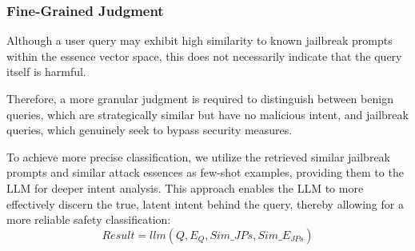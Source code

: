 \subsubsection{Fine-Grained Judgment}
Although a user query may exhibit high similarity to known jailbreak prompts within the essence vector space, this does not necessarily indicate that the query itself is harmful.

Therefore, a more granular judgment is required to distinguish between benign queries, which are strategically similar but have no malicious intent, and jailbreak queries, which genuinely seek to bypass security measures.

To achieve more precise classification, we utilize the retrieved similar jailbreak prompts and similar attack essences as few-shot examples, providing them to the LLM for deeper intent analysis. This approach enables the LLM to more effectively discern the true, latent intent behind the query, thereby allowing for a more reliable safety classification:
\begin{equation}
    \textit{Result} = \textit{llm}(Q, E_Q, \mathit{Sim\_JPs}, \mathit{Sim\_E_{JPs}})
\end{equation}









